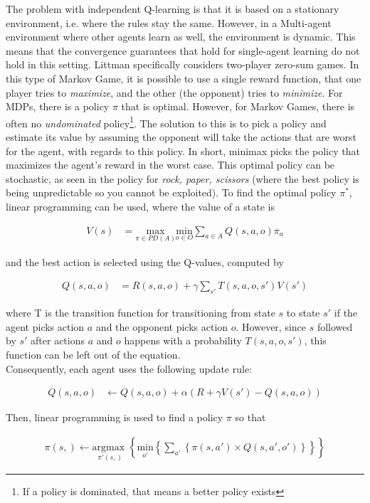 The problem with independent Q-learning is that it is based on a stationary environment, i.e. where the rules stay the same. However, in a Multi-agent environment where other agents learn as well, the environment is dynamic. This means that the convergence guarantees that hold for single-agent learning do not hold in this setting. Littman \cite{Littman94markovgames} specifically considers two-player zero-sum games. In this type of Markov Game, it is possible to use a single reward function, that one player tries to \textit{maximize}, and the other (the opponent) tries to \textit{minimize}. For MDPs, there is a policy $\pi$ that is optimal. However, for Markov Games, there is often no \textit{undominated} policy\footnote{If a policy is dominated, that means a better policy exists}. The solution to this is to pick a policy and estimate its value by assuming the opponent will take the actions that are worst for the agent, with regards to this policy. In short, minimax picks the policy that maximizes the agent's reward in the worst case. This optimal policy can be stochastic, as seen in the policy for \textit{rock, paper, scissors} (where the best policy is being unpredictable so you cannot be exploited). To find the optimal policy $\pi^*$, linear programming can be used, where the value of a state is
\begin{mdframed}
\begin{align}
V(s) &= \underset{\pi \in PD(A)}{\text{max}} \underset{o \in O}{\text{min}} \sum_{a\in A} Q(s,a,o) \pi_a
\end{align}
\end{mdframed}
and the best action is selected using the Q-values, computed by
\begin{mdframed}
\begin{align}
Q(s,a,o) &= R(s,a,o) + \gamma \sum_{s'} T(s,a,o,s') V(s')
\end{align}
\end{mdframed}
where T is the transition function for transitioning from state $s$ to state $s'$ if the agent picks action $a$ and the opponent picks action $o$. However, since $s$ followed by $s'$ after actions $a$ and $o$ happens with a probability $T(s,a,o,s')$, this function can be left out of the equation.\\

Consequently, each agent uses the following update rule:

\begin{mdframed}
\begin{align}
Q(s,a,o) & \leftarrow Q(s,a,o) + \alpha (R + \gamma V(s') - Q(s,a,o))
\end{align}
\label{ref:minimaxrule}
\end{mdframed}
Then, linear programming is used to find a policy $\pi$ so that
\begin{mdframed}
\begin{align}
\pi(s,) \leftarrow \underset{\pi'(s,)}{\text{argmax }} \left\{ \underset{o'}{\text{min}} \left\{ \sum_{a'}  \left\{ \pi(s,a') \times Q(s,a',o') \right\} \right\} \right\}
\end{align}
\end{mdframed}

